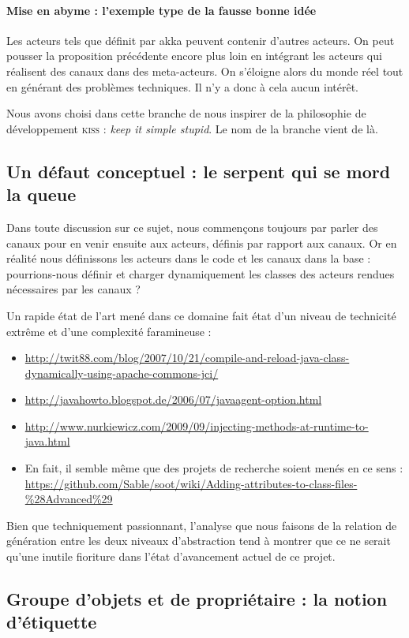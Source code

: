 \documentclass[11pt]{article}
\begin{document}
\paragraph{Mise en abyme : l'exemple type de la fausse bonne idée} Les acteurs tels que définit par akka peuvent contenir d'autres acteurs. On peut pousser la proposition précédente encore plus loin en intégrant les acteurs qui réalisent des canaux dans des meta-acteurs. On s'éloigne alors du monde réel tout en générant des problèmes techniques. Il n'y a donc à cela aucun intérêt.

Nous avons choisi dans cette branche de nous inspirer de la \og philosophie de développement \fg{} \textsc{kiss} : \textsl{keep it simple stupid}. Le nom de la branche vient de là.

\subsection{Un défaut conceptuel : le serpent qui se mord la queue}

Dans toute discussion sur ce sujet, nous commençons toujours par parler des canaux pour en venir ensuite aux acteurs, définis par rapport aux canaux. Or en réalité nous définissons les acteurs dans le code et les canaux dans la base : pourrions-nous définir et charger dynamiquement les classes des acteurs rendues nécessaires par les canaux ?

Un rapide état de l'art mené dans ce domaine fait état d'un niveau de technicité extrême et d'une complexité faramineuse :
\begin{itemize}
\item \url{http://twit88.com/blog/2007/10/21/compile-and-reload-java-class-dynamically-using-apache-commons-jci/}
\item \url{http://javahowto.blogspot.de/2006/07/javaagent-option.html}
\item \url{http://www.nurkiewicz.com/2009/09/injecting-methods-at-runtime-to-java.html}
\item En fait, il semble même que des projets de recherche soient menés en ce sens : \url{https://github.com/Sable/soot/wiki/Adding-attributes-to-class-files-\%28Advanced\%29}
\end{itemize}
Bien que techniquement passionnant, l'analyse que nous faisons de la relation de génération entre les deux niveaux d'abstraction tend à montrer que ce ne serait qu'une inutile fioriture dans l'état d'avancement actuel de ce projet.

\subsection{Groupe d'objets et de propriétaire : la notion d'étiquette}
\end{document}
